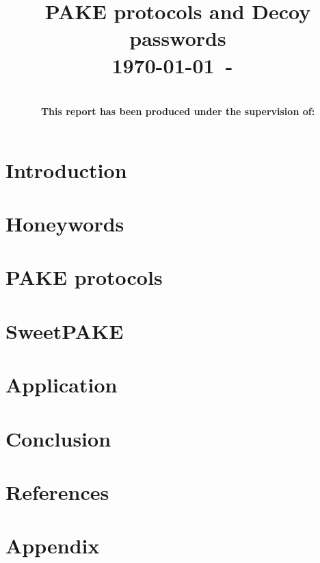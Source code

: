 \documentclass[conference, compsoc]{IEEEtran}
\begin{document}
\title{PAKE protocols and Decoy passwords\\
{\small \today~-~\currenttime}}

\author{
    \\
    {\bf This report has been produced under the supervision of:}\\
    }

\maketitle

\begin{abstract}
\end{abstract}

\begin{IEEEkeywords}
\end{IEEEkeywords}

\section{Introduction}


\section{Honeywords}


\section{PAKE protocols}


\section{SweetPAKE}


\section{Application}


\section{Conclusion}


\section{References}
\printbibliography

\section{Appendix}
\end{document}
